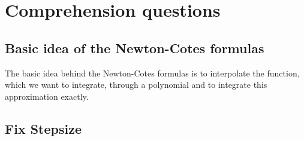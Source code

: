 \setcounter{section}{-1}
\section{Comprehension questions}
\subsection{Basic idea of the Newton-Cotes formulas }
The basic idea behind the Newton-Cotes formulas is to interpolate the function, which we want to integrate, through a polynomial and to integrate this approximation exactly.
\subsection{Fix Stepsize}
